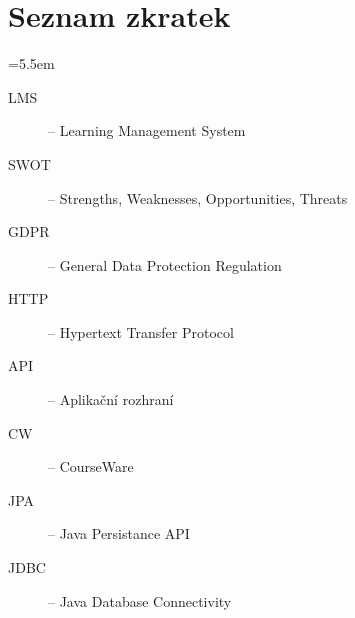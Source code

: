 \appendix

\chapter{Seznam zkratek}

\medskip
\bgroup \leftskip=5.5em

\begin{description}

	\item[LMS] -- Learning Management System
	
	\item[SWOT] -- Strengths, Weaknesses, Opportunities, Threats
	
	\item[GDPR] -- General Data Protection Regulation
	
	\item[HTTP] -- Hypertext Transfer Protocol
	
	\item[API] -- Aplikační rozhraní
	
	\item[CW] -- CourseWare
	
	\item[JPA] -- Java Persistance API
	
	\item[JDBC] -- Java Database Connectivity	
	

\end{description}

\par\egroup